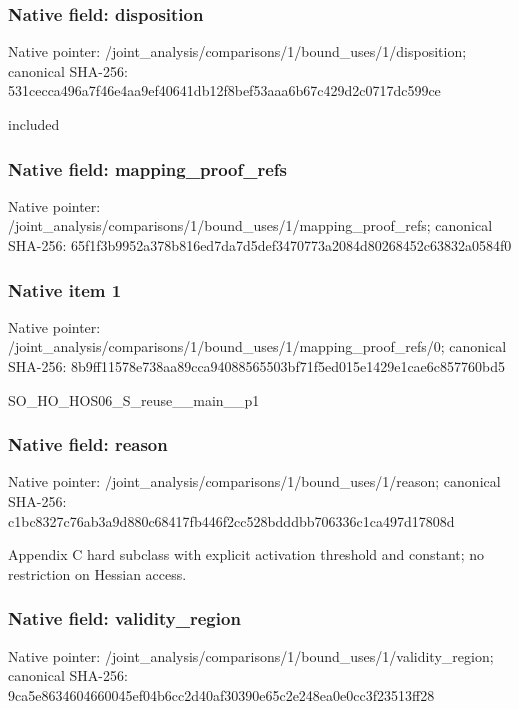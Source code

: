 \documentclass[10pt,a4paper]{article}
\begin{document}
\subsubsection{Native field: disposition}
Native pointer: /joint\_\allowbreak{}analysis/comparisons/1/bound\_\allowbreak{}uses/1/disposition; canonical SHA-256: 531cecca496a7f46e4aa9ef40641db12f8bef53aaa6b67c429d2c0717dc599ce

\begingroup\raggedright\sloppy included\par\endgroup

\subsubsection{Native field: mapping\_\allowbreak{}proof\_\allowbreak{}refs}
Native pointer: /joint\_\allowbreak{}analysis/comparisons/1/bound\_\allowbreak{}uses/1/mapping\_\allowbreak{}proof\_\allowbreak{}refs; canonical SHA-256: 65f1f3b9952a378b816ed7da7d5def3470773a2084d80268452c63832a0584f0

\subsubsection{Native item 1}
Native pointer: /joint\_\allowbreak{}analysis/comparisons/1/bound\_\allowbreak{}uses/1/mapping\_\allowbreak{}proof\_\allowbreak{}refs/0; canonical SHA-256: 8b9ff11578e738aa89cca94088565503bf71f5ed015e1429e1cae6c857760bd5

\begingroup\raggedright\sloppy SO\_\allowbreak{}HO\_\allowbreak{}HOS06\_\allowbreak{}S\_\allowbreak{}reuse\_\allowbreak{}\_\allowbreak{}main\_\allowbreak{}\_\allowbreak{}p1\par\endgroup

\subsubsection{Native field: reason}
Native pointer: /joint\_\allowbreak{}analysis/comparisons/1/bound\_\allowbreak{}uses/1/reason; canonical SHA-256: c1bc8327c76ab3a9d880c68417fb446f2cc528bdddbb706336c1ca497d17808d

\begingroup\raggedright\sloppy Appendix C hard subclass with explicit activation threshold and constant;\allowbreak{} no restriction on Hessian access.\par\endgroup

\subsubsection{Native field: validity\_\allowbreak{}region}
Native pointer: /joint\_\allowbreak{}analysis/comparisons/1/bound\_\allowbreak{}uses/1/validity\_\allowbreak{}region; canonical SHA-256: 9ca5e8634604660045ef04b6cc2d40af30390e65c2e248ea0e0cc3f23513ff28
\end{document}
